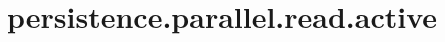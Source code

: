 \section{persistence.parallel.read.active}
\label{configuration:PersistenceParallelReadActive}
\AvailableInJavaOnly{\TODO}